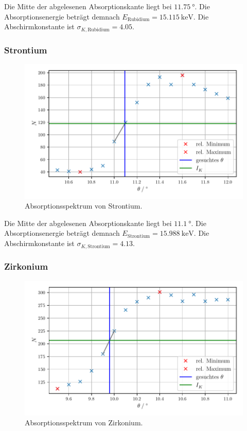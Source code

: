 Die Mitte der abgelesenen Absorptionskante liegt bei $\SI{11.75}{\degree}$.
Die Absorptionsenergie beträgt demnach $E_\text{Rubidium} = \SI{15.115}{\kilo\electronvolt}$.
Die Abschirmkonstante ist $\sigma_{K, \text{Rubidium}} = \num{4.05}$.

\subsubsection{Strontium}

\begin{figure}[H]
    \centering
    \includegraphics[width=\textwidth]{build/plot_strontium.pdf}
    \caption{Absorptionsspektrum von Strontium.}
    \label{fig:strontium}
\end{figure}

Die Mitte der abgelesenen Absorptionskante liegt bei $\SI{11.1}{\degree}$.
Die Absorptionsenergie beträgt demnach $E_\text{Strontium} = \SI{15.988}{\kilo\electronvolt}$.
Die Abschirmkonstante ist $\sigma_{K, \text{Strontium}} = \num{4.13}$.

\subsubsection{Zirkonium}

\begin{figure}[H]
    \centering
    \includegraphics[width=\textwidth]{build/plot_zirkonium.pdf}
    \caption{Absorptionsspektrum von Zirkonium.}
    \label{fig:zirkonium}
\end{figure}

